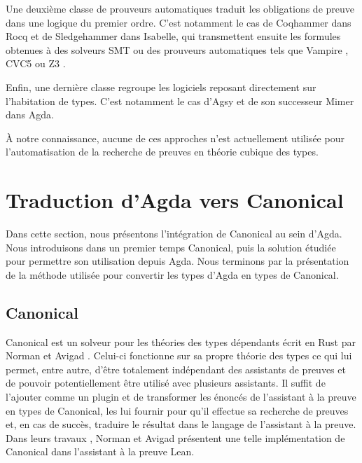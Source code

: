 \documentclass[11pt]{article}
\begin{document}
Une deuxième classe de prouveurs automatiques traduit les obligations de preuve dans une logique du premier ordre. 
C’est notamment le cas de Coqhammer \cite{czajka2018hammer} dans Rocq et de Sledgehammer \cite{bohme2010sledgehammer} dans Isabelle, 
qui transmettent ensuite les formules obtenues à des solveurs SMT ou des prouveurs automatiques tels que Vampire \cite{bartek2025vampire}, 
CVC5 \cite{barbosa2022cvc5} ou Z3 \cite{de2008z3}.

Enfin, une dernière classe regroupe les logiciels reposant directement sur l'habitation de types. 
C’est notamment le cas d’Agsy et de son successeur Mimer \cite{skystedt2022new} dans Agda.

À notre connaissance, aucune de ces approches n’est actuellement utilisée pour l’automatisation de la recherche de preuves en théorie cubique des types. 

\section{Traduction d'Agda vers Canonical}
Dans cette section, nous présentons l’intégration de Canonical au sein d’Agda. 
Nous introduisons dans un premier temps Canonical, puis la solution étudiée pour permettre son utilisation depuis Agda. 
Nous terminons par la présentation de la méthode utilisée pour convertir les types d’Agda en types de Canonical.

\subsection{Canonical}
Canonical est un solveur pour les théories des types dépendants écrit en Rust par Norman et Avigad \cite{norman2025canonical}.
Celui-ci fonctionne sur sa propre théorie des types ce qui lui permet, entre autre, 
d'être totalement indépendant des assistants de preuves et de pouvoir potentiellement être utilisé avec plusieurs assistants.
Il suffit de l'ajouter comme un plugin et de transformer les énoncés de l'assistant à la preuve en types de Canonical,
les lui fournir pour qu'il effectue sa recherche de preuves et, en cas de succès, traduire le résultat dans le langage de l'assistant à la preuve.
Dans leurs travaux \cite{norman2025canonical}, Norman et Avigad présentent une telle implémentation de Canonical dans l'assistant à la preuve Lean. 
\end{document}
